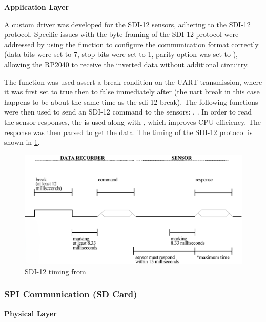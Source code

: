 \textbf{Application Layer}

A custom driver was developed for the SDI-12 sensors, adhering to the SDI-12 
protocol. Specific issues with the byte framing of the SDI-12 protocol were addressed by using the 
 function to configure the communication format correctly (data bits 
were set to 7, stop bits were set to 1, parity option was set to ), 
allowing the RP2040 to receive the inverted data without additional circuitry. 

The  function was used assert a break condition on the UART transmission, where it was first set 
to true then to false immediately after (the uart break in this case happens to be about the same time as the sdi-12 break). 
The following functions were then used to send an SDI-12 command to the sensors: , .
In order to read the sensor responses, the  is used along with , which 
improves CPU efficiency. The response was then parsed to get the data. The timing of the SDI-12 protocol is shown 
in \cref{sdi12_timing}.

\begin{figure}
    \includegraphics[width=\linewidth]{figures/SDI-12_timing.png}
    \caption{SDI-12 timing from \cite{sdi12_datasheet}}
    \label{sdi12_timing}
\end{figure}

\subsubsection{SPI Communication (SD Card)}

\textbf{Physical Layer}

